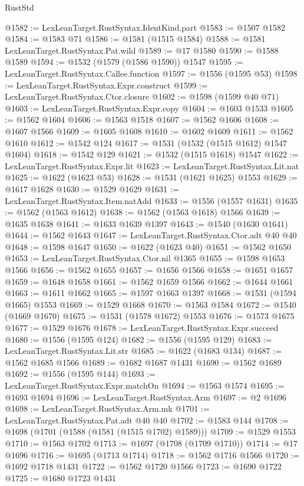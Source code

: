\begin{lexlean}{RustStd}
\begin{coremodule}
@1582 := LexLeanTarget.RustSyntax.IdentKind.part
@1583 := @1507 @1582
@1584 := @1583 @71
@1586 := @1581 (@1515 @1584)
@1588 := @1581 LexLeanTarget.RustSyntax.Pat.wild
@1589 := @17 @1580
@1590 := @1588 @1589
@1594 := @1532 (@1579 (@1586 @1590)) @1547
@1595 := LexLeanTarget.RustSyntax.Callee.function
@1597 := @1556 (@1595 @53)
@1598 := LexLeanTarget.RustSyntax.Expr.construct
@1599 := LexLeanTarget.RustSyntax.Ctor.closure
@1602 := @1598 (@1599 @40 @71)
@1603 := LexLeanTarget.RustSyntax.Expr.copy
@1604 := @1603 @1533
@1605 := @1562 @1604
@1606 := @1563 @1518
@1607 := @1562 @1606
@1608 := @1607 @1566
@1609 := @1605 @1608
@1610 := @1602 @1609
@1611 := @1562 @1610
@1612 := @1542 @124
@1617 := @1531 (@1532 (@1515 @1612) @1547 @1604)
@1618 := @1542 @129
@1621 := @1532 (@1515 @1618) @1547
@1622 := LexLeanTarget.RustSyntax.Expr.lit
@1623 := LexLeanTarget.RustSyntax.Lit.nat
@1625 := @1622 (@1623 @53)
@1628 := @1531 (@1621 @1625) @1553
@1629 := @1617 @1628
@1630 := @1529 @1629
@1631 := LexLeanTarget.RustSyntax.Item.natAdd
@1633 := @1556 (@1557 @1631)
@1635 := @1562 (@1563 @1612)
@1638 := @1562 (@1563 @1618) @1566
@1639 := @1635 @1638
@1641 := @1633 @1639 @1397
@1643 := @1540 (@1630 @1641)
@1644 := @1562 @1643
@1647 := LexLeanTarget.RustSyntax.Ctor.adt @40 @40
@1648 := @1598 @1647
@1650 := @1622 (@1623 @40)
@1651 := @1562 @1650
@1653 := LexLeanTarget.RustSyntax.Ctor.nil @1365
@1655 := @1598 @1653 @1566
@1656 := @1562 @1655
@1657 := @1656 @1566
@1658 := @1651 @1657
@1659 := @1648 @1658
@1661 := @1562 @1659 @1566
@1662 := @1644 @1661
@1663 := @1611 @1662
@1665 := @1597 @1663 @1397
@1668 := @1531 (@1594 @1665) @1553
@1669 := @1529 @1668
@1670 := @1563 @1584
@1672 := @1540 (@1669 @1670)
@1675 := @1531 (@1578 @1672) @1553
@1676 := @1573 @1675
@1677 := @1529 @1676
@1678 := LexLeanTarget.RustSyntax.Expr.succeed
@1680 := @1556 (@1595 @124)
@1682 := @1556 (@1595 @129)
@1683 := LexLeanTarget.RustSyntax.Lit.str
@1685 := @1622 (@1683 @134)
@1687 := @1562 @1685 @1566
@1689 := @1682 @1687 @1431
@1690 := @1562 @1689
@1692 := @1556 (@1595 @144)
@1693 := LexLeanTarget.RustSyntax.Expr.matchOn
@1694 := @1563 @1574
@1695 := @1693 @1694
@1696 := LexLeanTarget.RustSyntax.Arm
@1697 := @2 @1696
@1698 := LexLeanTarget.RustSyntax.Arm.mk
@1701 := LexLeanTarget.RustSyntax.Pat.adt @40 @40
@1702 := @1583 @144
@1708 := @1698 (@1701 (@1588 (@1581 (@1515 @1702) @1589)))
@1709 := @1529 @1553
@1710 := @1563 @1702
@1713 := @1697 (@1708 (@1709 @1710))
@1714 := @17 @1696
@1716 := @1695 (@1713 @1714)
@1718 := @1562 @1716 @1566
@1720 := @1692 @1718 @1431
@1722 := @1562 @1720 @1566
@1723 := @1690 @1722
@1725 := @1680 @1723 @1431

\end{coremodule}
\end{lexlean}
